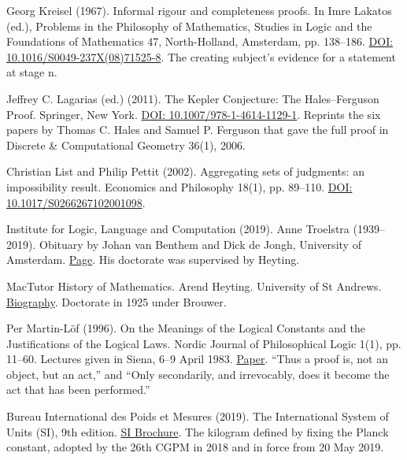 \documentclass[11pt,twoside]{article}
\theoremstyle{thielethm}
\theoremstyle{thieledef}
\theoremstyle{thieledef}
\theoremstyle{thieledef}
\theoremstyle{thielethm}
\theoremstyle{thieleobs}
\theoremstyle{thielethm}
\begin{document}
\noindent Georg Kreisel (1967). Informal rigour and completeness proofs. In Imre Lakatos (ed.), Problems in the Philosophy of Mathematics, Studies in Logic and the Foundations of Mathematics 47, North-Holland, Amsterdam, pp. 138--186. \href{https://doi.org/10.1016/S0049-237X(08)71525-8}{DOI: 10.1016/S0049-237X(08)71525-8}. The creating subject's evidence for a statement at stage n.
\par\medskip

\noindent Jeffrey C. Lagarias (ed.) (2011). The Kepler Conjecture: The Hales--Ferguson Proof. Springer, New York. \href{https://doi.org/10.1007/978-1-4614-1129-1}{DOI: 10.1007/978-1-4614-1129-1}. Reprints the six papers by Thomas C. Hales and Samuel P. Ferguson that gave the full proof in Discrete \& Computational Geometry 36(1), 2006.
\par\medskip

\noindent Christian List and Philip Pettit (2002). Aggregating sets of judgments: an impossibility result. Economics and Philosophy 18(1), pp. 89--110. \href{https://doi.org/10.1017/S0266267102001098}{DOI: 10.1017/S0266267102001098}.
\par\medskip

\noindent Institute for Logic, Language and Computation (2019). Anne Troelstra (1939--2019). Obituary by Johan van Benthem and Dick de Jongh, University of Amsterdam. \href{https://www.illc.uva.nl/NewsandEvents/News/Obituaries/Anne-Troelstra-1939-2019-/}{Page}. His doctorate was supervised by Heyting.
\par\medskip

\noindent MacTutor History of Mathematics. Arend Heyting. University of St Andrews. \href{https://mathshistory.st-andrews.ac.uk/Biographies/Heyting/}{Biography}. Doctorate in 1925 under Brouwer.
\par\medskip

\noindent Per Martin-L\"of (1996). On the Meanings of the Logical Constants and the Justifications of the Logical Laws. Nordic Journal of Philosophical Logic 1(1), pp. 11--60. Lectures given in Siena, 6--9 April 1983. \href{https://ncatlab.org/nlab/files/MartinLofOnTheMeaning96.pdf}{Paper}. ``Thus a proof is, not an object, but an act,'' and ``Only secondarily, and irrevocably, does it become the act that has been performed.''
\par\medskip

\noindent Bureau International des Poids et Mesures (2019). The International System of Units (SI), 9th edition. \href{https://www.bipm.org/en/publications/si-brochure}{SI Brochure}. The kilogram defined by fixing the Planck constant, adopted by the 26th CGPM in 2018 and in force from 20 May 2019.
\par\medskip
\end{document}

